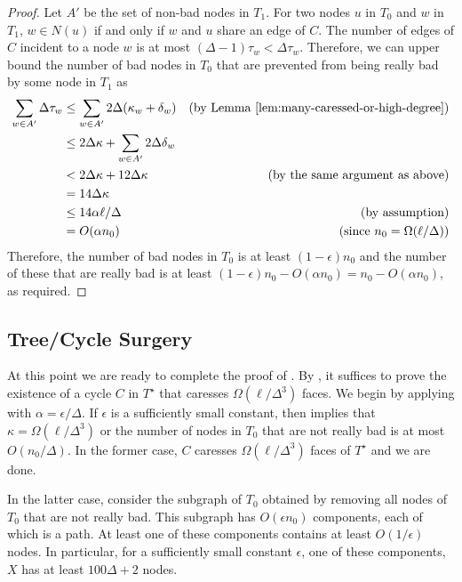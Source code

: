 \documentclass{patmorin}
\newcommand{\dual}[1]{{#1}^\star}
\begin{document}
\begin{proof}
  Let $A'$ be the set of non-bad nodes in $T_1$.  For two
  nodes $u$ in $T_0$ and $w$ in $T_1$,  $w\in N(u)$ if and only if $w$
  and $u$ share an edge of $C$.  The number of edges of $C$ incident to a node $w$ is at most $(\Delta-1)\tau_w < \Delta\tau_w$.  Therefore, we can upper bound the number of bad nodes in $T_0$ that are prevented from being really bad by some node in $T_1$ as
  \begin{align*}
   \sum_{w\in A'}\Delta \tau_w  
    & \le  \sum_{w\in A'}2\Delta(\kappa_w + \delta_w) & \text{(by \lemref{many-caressed-or-high-degree})} \\
    & \le  2\Delta\kappa + \sum_{w\in A'}2\Delta\delta_w \\
    & < 2\Delta\kappa + 12\Delta\kappa & \text{(by the same argument as above)}\\
    & = 14\Delta\kappa \\
    & \le 14\alpha\ell/\Delta & \text{(by assumption)}\\
    & = O(\alpha n_0) & \text{(since $n_0=\Omega(\ell/\Delta)$)}
  \end{align*}
  Therefore, the number of bad nodes in $T_0$ is at least
  $(1-\epsilon)n_0$ and the number of these that are really bad is
  at least $(1-\epsilon)n_0 - O(\alpha n_0) = n_0-O(\alpha n_0)$,
  as required.
\end{proof}


\subsection{Tree/Cycle Surgery}

At this point we are ready to complete the proof of .
By , it suffices to prove the existence of a
cycle $C$ in $\dual{T}$ that caresses $\Omega(\ell/\Delta^3)$ faces.
We begin by applying  with $\alpha =
\epsilon/\Delta$.  If $\epsilon$ is a sufficiently small constant, then
 implies that $\kappa = \Omega(\ell/\Delta^3)$
or the number of nodes in $T_0$ that are not really bad is at most
$O(n_0/\Delta)$.  In the former case, $C$ caresses $\Omega(\ell/\Delta^3)$
faces of $\dual{T}$ and we are done.

In the latter case, consider the subgraph of $T_0$ obtained by
removing all nodes of $T_0$ that are not really bad.  This subgraph has
$O(\epsilon n_0)$ components, each of which is a path.  At least one of
these components contains at least $O(1/\epsilon)$ nodes. In particular,
for a sufficiently small constant $\epsilon$, one of these components,
$X$ has at least $100\Delta+2$ nodes.
\end{document}
